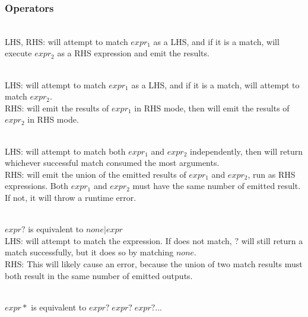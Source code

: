 \subsubsection{Operators}
\begin{description}
\item[$expr_1 \text{{\tt ->}} expr_2$] \hfill \\
  LHS, RHS: will attempt to match $expr_1$ as a LHS, and if it is a match,
  will execute $expr_2$ as a RHS expression and emit the results.

\item[$expr_1 \phantom{.} expr_2$] \hfill \\
  LHS: will attempt to match $expr_1$ as a LHS, and if it is a match,
  will attempt to match $expr_2$.
  \\RHS: will emit the results of $expr_1$ in RHS mode, then will emit the results of $expr_2$ in RHS mode.

\item[$expr_1 | expr_2$] \hfill \\
  LHS: will attempt to match both $expr_1$ and $expr_2$ independently, then will
  return whichever successful match consumed the most arguments.
  \\RHS: will emit the union of the emitted results of $expr_1$ and $expr_2$,
  run as RHS expressions. Both $expr_1$ and $expr_2$ must have the same
  number of emitted result. If not, it will throw a runtime error.

\item[$expr?$] \hfill \\
  $expr?$ is equivalent to $none|expr$\\
  LHS: will attempt to match the expression. If does not match, $?$ will still
  return a match successfully, but it does so by matching $none$.\\
  RHS: This will likely cause an error, because the union of two match
  results must both result in the same number of emitted outputs.

\item[$expr*$] \hfill \\
  $expr*$ is equivalent to $expr? \phantom{.} expr? \phantom{.}  expr?  \dots$
\end{description}



